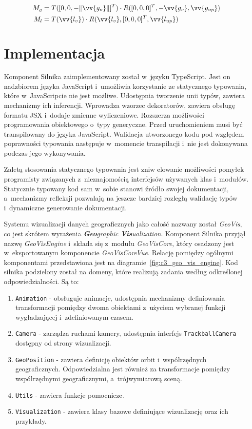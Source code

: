 \begin{align}
    \label{eq:t_1}
      M_g &= T([0, 0, -\Vert\vv{g_v}\Vert]^T) \cdot R([0, 0, 0]^T, -\vv{g_v}, \vv{g_{up}}) \\
    \label{eq:t_2}
      M_l &= T(\vv{l_v}) \cdot R(\vv{l_v}, [0, 0, 0]^T, \vv{l_{up}})
\end{align}

\section{Implementacja}

Komponent Silnika zaimplementowany został w~języku TypeScript\cite{TypeScript}. Jest on nadzbiorem języka JavaScript i~umożliwia korzystanie ze statycznego typowania, które w~JavaScripcie nie jest możliwe. Udostępnia tworzenie unii typów, zawiera mechanizmy ich inferencji. Wprowadza wzorzec dekoratorów, zawiera obsługę formatu JSX i~dodaje zmienne wyliczeniowe. Rozszerza możliwości programowania obiektowego o~typy generyczne. Przed uruchomieniem musi być transpilowany do języka JavaScript. Walidacja utworzonego kodu pod względem poprawności typowania następuje w~momencie transpilacji i~nie jest dokonywana podczas jego wykonywania. 

Zaletą stosowania statycznego typowania jest zniw elowanie możliwości pomyłek programisty związanych z~nieznajomością interfejsów używanych klas i~modułów. Statycznie typowany kod sam w~sobie stanowi źródło swojej dokumentacji, a~mechanizmy refleksji pozwalają na jeszcze bardziej rozległą walidację typów i~dynamiczne generowanie dokumentacji.

Systemu wizualizacji danych geograficznych jako całość nazwany został \textit{GeoVis}, co jest skrótem wyrażenia \textit{\textbf{Geo}graphic \textbf{Vis}ualization}. Komponent Silnika przyjął nazwę \mbox{\textit{GeoVisEngine}} i~składa się z~modułu \mbox{\textit{GeoVisCore}}, który osadzony jest w~eksportowanym komponencie \mbox{\textit{GeoVisCoreVue}}. Relację pomiędzy ogólnymi komponentami przedstawiona jest na diagramie~\ref{fig:c3_geo_vis_engine}. Kod silnika podzielony został na domeny, które realizują zadania według odkreślonej odpowiedzialności. Są to:

\begin{enumerate}
    \item \texttt{Animation} - obsługuje animacje, udostępnia mechanizmy definiowania transformacji pomiędzy dwoma obiektami z~użyciem wybranej funkcji wygładzającej i~zdefiniowanym czasem.
    \item \texttt{Camera} - zarządza ruchami kamery, udostępnia interfejs \texttt{TrackballCamera} dostępny od strony wizualizacji.
    \item \texttt{GeoPosition} - zawiera definicję obiektów orbit i~współrzędnych geograficznych. Odpowiedzialna jest również za transformacje pomiędzy współrzędnymi geograficznymi, a~trójwymiarową sceną.
    \item \texttt{Utils} - zawiera funkcje pomocnicze.
    \item \texttt{Visualization} - zawiera klasy bazowe definiujące wizualizację oraz ich przykłady.
\end{enumerate}

